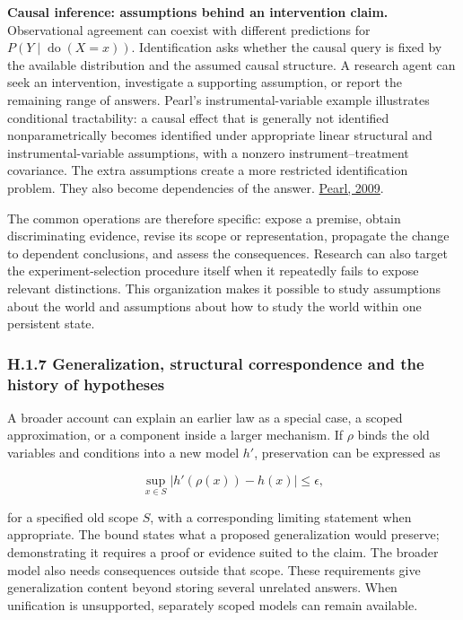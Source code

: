 \documentclass[11pt,a4paper]{article}
\begin{document}
\textbf{Causal inference: assumptions behind an intervention claim.} Observational agreement can coexist with different predictions for \(P(Y\mid\operatorname{do}(X=x))\). Identification asks whether the causal query is fixed by the available distribution and the assumed causal structure. A research agent can seek an intervention, investigate a supporting assumption, or report the remaining range of answers. Pearl's instrumental-variable example illustrates conditional tractability: a causal effect that is generally not identified nonparametrically becomes identified under appropriate linear structural and instrumental-variable assumptions, with a nonzero instrument--treatment covariance. The extra assumptions create a more restricted identification problem. They also become dependencies of the answer. \href{https://escholarship.org/content/qt36w8n7pg/qt36w8n7pg.pdf}{Pearl, 2009}.


The common operations are therefore specific: expose a premise, obtain discriminating evidence, revise its scope or representation, propagate the change to dependent conclusions, and assess the consequences. Research can also target the experiment-selection procedure itself when it repeatedly fails to expose relevant distinctions. This organization makes it possible to study assumptions about the world and assumptions about how to study the world within one persistent state.


\subsubsection*{H.1.7 Generalization, structural correspondence and the history of hypotheses}

A broader account can explain an earlier law as a special case, a scoped approximation, or a component inside a larger mechanism. If \(\rho\) binds the old variables and conditions into a new model \(h'\), preservation can be expressed as


\[
\sup_{x\in S}\left|h'(\rho(x))-h(x)\right|\leq\epsilon,
\]


for a specified old scope \(S\), with a corresponding limiting statement when appropriate. The bound states what a proposed generalization would preserve; demonstrating it requires a proof or evidence suited to the claim. The broader model also needs consequences outside that scope. These requirements give generalization content beyond storing several unrelated answers. When unification is unsupported, separately scoped models can remain available.
\end{document}
